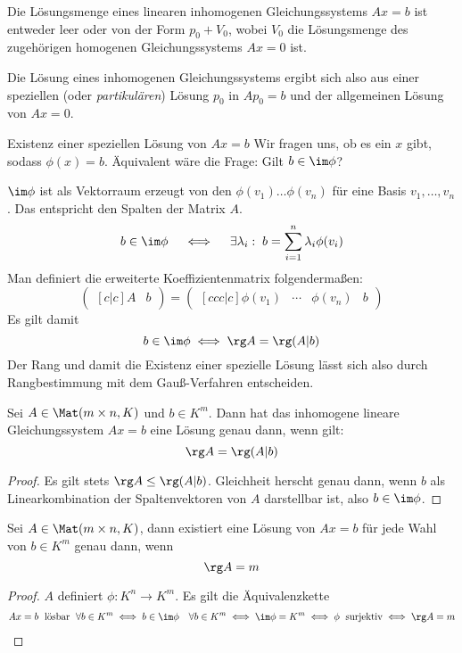\documentclass[a4paper, 10pt]{scrbook}
\begin{document}
Die Lösungsmenge eines linearen inhomogenen Gleichungssystems $Ax=b$ ist entweder leer oder von der Form $p_0+V_0$, wobei $V_0$ die Lösungsmenge des zugehörigen homogenen Gleichungssystems $Ax=0$ ist.

Die Lösung eines inhomogenen Gleichungssystems ergibt sich also aus einer speziellen (oder \emph{partikulären}) Lösung $p_0$ in $Ap_0 = b$ und der allgemeinen Lösung von $Ax=0$.

\begin{seg}{Existenz einer speziellen Lösung von $Ax=b$}
	Wir fragen uns, ob es ein $x$ gibt, sodass $\phi(x) = b$.
	Äquivalent wäre die Frage: Gilt $b\in\im\phi$?

	$\im\phi$ ist als Vektorraum erzeugt von den $\phi(v_1)\dotsc\phi(v_n)$ für eine Basis $v_1,\dotsc,v_n$.
	Das entspricht den Spalten der Matrix $A$.
\[
b\in\im\phi \quad \iff\quad \exists \lambda_i:\;b=\sum_{i=1}^n\lambda_i\phi(v_i)
\]
Man definiert die erweiterte Koeffizientenmatrix folgendermaßen:
\[
	\begin{pmatrix}[c|c] A&b\end{pmatrix}=\begin{pmatrix}[ccc|c]\phi(v_1)&\cdots&\phi(v_n)&b\end{pmatrix}
\]
Es gilt damit
\[
b\in\im\phi \iff \rg A = \rg(A|b)
\]
Der Rang und damit die Existenz einer spezielle Lösung lässt sich also durch Rangbestimmung mit dem Gauß-Verfahren entscheiden.
\end{seg}
\begin{thm} \label{thm:8.13}
Sei $A \in \Mat(m\times n,K)$ und $b\in K^m$. Dann hat das inhomogene lineare Gleichungssystem $Ax=b$ eine Lösung genau dann, wenn gilt:
\[
\rg A=\rg(A|b)
\]
\begin{proof}
	Es gilt stets $\rg A \le \rg(A|b)$.
	Gleichheit herscht genau dann, wenn $b$ als Linearkombination der Spaltenvektoren von $A$ darstellbar ist, also $b\in \im \phi$.
\end{proof}
\end{thm}

\begin{kor}
	\label{kor:8.14}
	Sei $A\in \Mat(m\times n, K)$, dann existiert eine Lösung von $Ax=b$ für jede Wahl von $b\in K^m$ genau dann, wenn
	\[
		\rg A = m
	\]
\begin{proof}
$A$ definiert $\phi:K^n\to K^m$.
Es gilt die Äquivalenzkette
\begin{align*}
Ax=b \; \text{ lösbar $\;\forall b\in K^m$} 
	\iff b\in\im\phi \quad \forall b\in K^m
	\iff \im \phi = K^m
	\iff \phi\; \text{ surjektiv} 
	\iff \rg A =m
\end{align*}
\end{proof}
\end{kor}
\end{document}
